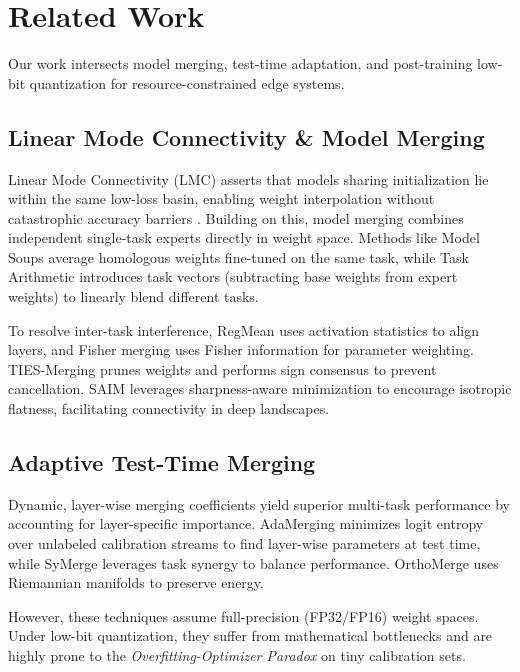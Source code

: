 \section{Related Work}
\label{sec:related_work}

Our work intersects model merging, test-time adaptation, and post-training low-bit quantization for resource-constrained edge systems.

\subsection{Linear Mode Connectivity \& Model Merging}
Linear Mode Connectivity (LMC) asserts that models sharing initialization lie within the same low-loss basin, enabling weight interpolation without catastrophic accuracy barriers \cite{frankle2018lottery, entezari2021role, garipov2018loss}. Building on this, model merging combines independent single-task experts directly in weight space.
Methods like Model Soups \cite{wortsman2022model} average homologous weights fine-tuned on the same task, while Task Arithmetic \cite{ilharco2022editing} introduces task vectors (subtracting base weights from expert weights) to linearly blend different tasks.

To resolve inter-task interference, RegMean \cite{jin2023regmean} uses activation statistics to align layers, and Fisher merging \cite{matena2022merging} uses Fisher information for parameter weighting. TIES-Merging \cite{yadav2023resolving} prunes weights and performs sign consensus to prevent cancellation. SAIM \cite{anonymous2026saim} leverages sharpness-aware minimization to encourage isotropic flatness, facilitating connectivity in deep landscapes.

\subsection{Adaptive Test-Time Merging}
Dynamic, layer-wise merging coefficients yield superior multi-task performance by accounting for layer-specific importance. AdaMerging \cite{yang2024adamerging} minimizes logit entropy over unlabeled calibration streams to find layer-wise parameters at test time, while SyMerge \cite{jung2025symerge} leverages task synergy to balance performance. OrthoMerge \cite{yang2026orthomerge} uses Riemannian manifolds to preserve energy. 

However, these techniques assume full-precision (FP32/FP16) weight spaces. Under low-bit quantization, they suffer from mathematical bottlenecks and are highly prone to the \emph{Overfitting-Optimizer Paradox} on tiny calibration sets.

